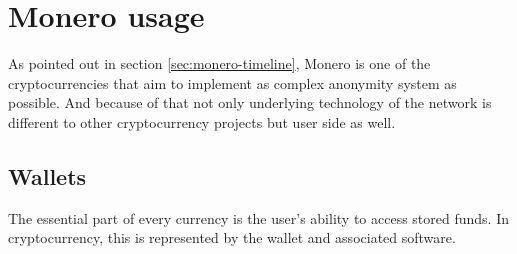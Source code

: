 \documentclass[
  printed, %
  table,   %
  nolof,     %
  nolot,     %
           oneside, color
]{fithesis3}
\begin{document}
\chapter{Monero usage}
As pointed out in section \ref{sec:monero-timeline}, Monero is one of the cryptocurrencies that aim to implement as complex anonymity system as possible. And because of that not only underlying technology of the network is different to other cryptocurrency projects but user side as well. 
\section{Wallets}
The essential part of every currency is the user's ability to access stored funds. In cryptocurrency, this is represented by the wallet and associated software.
\end{document}
